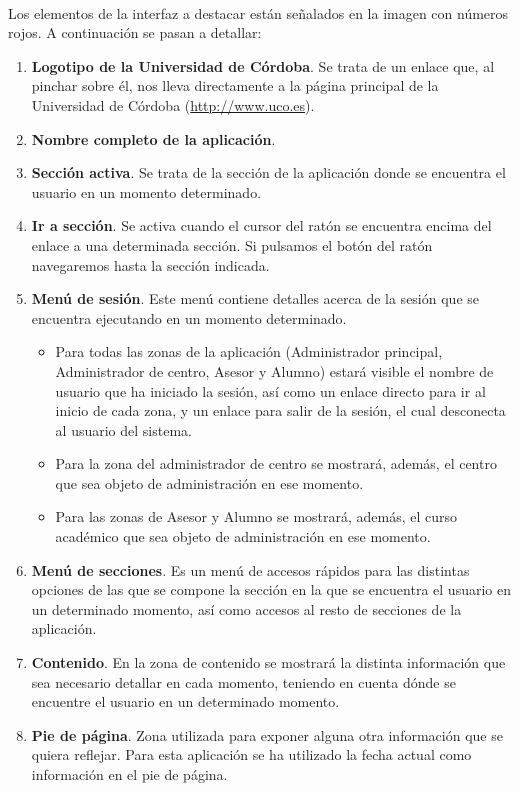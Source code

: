   \paragraph{}Los elementos de la interfaz a destacar están señalados en la
  imagen con números rojos. A continuación se pasan a detallar:

  \begin{enumerate}
    \item \textbf{Logotipo de la Universidad de Córdoba}. Se trata de un
    enlace que, al pinchar sobre él, nos lleva directamente a la página
    principal de la Universidad de Córdoba (\url{http://www.uco.es}).
    \item \textbf{Nombre completo de la aplicación}.
    \item \textbf{Sección activa}. Se trata de la sección de la aplicación donde
    se encuentra el usuario en un momento determinado.
    \item \textbf{Ir a sección}. Se activa cuando el cursor del ratón se
    encuentra encima del enlace a una determinada sección. Si pulsamos el botón
    del ratón navegaremos hasta la sección indicada.
    \item \textbf{Menú de sesión}. Este menú contiene detalles acerca de la
    sesión que se encuentra ejecutando en un momento determinado.
    \begin{itemize}
      \item Para todas las zonas de la aplicación (Administrador principal,
      Administrador de centro, Asesor y Alumno) estará visible el nombre de
      usuario que ha iniciado la sesión, así como un enlace directo para ir al
      inicio de cada zona, y un enlace para salir de la sesión, el cual
      desconecta al usuario del sistema.
      \item Para la zona del administrador de centro se mostrará, además,
      el centro que sea objeto de administración en ese momento.
      \item Para las zonas de Asesor y Alumno se mostrará, además, el curso
      académico que sea objeto de administración en ese momento.
    \end{itemize}

    \item \textbf{Menú de secciones}. Es un menú de accesos rápidos para las
    distintas opciones de las que se compone la sección en la que se encuentra
    el usuario en un determinado momento, así como accesos al resto de
    secciones de la aplicación.
    \item \textbf{Contenido}. En la zona de contenido se mostrará la distinta
    información que sea necesario detallar en cada momento, teniendo en cuenta
    dónde se encuentre el usuario en un determinado momento.
    \item \textbf{Pie de página}. Zona utilizada para exponer alguna otra
    información que se quiera reflejar. Para esta aplicación se ha utilizado
    la fecha actual como información en el pie de página.
  \end{enumerate}

  
  
